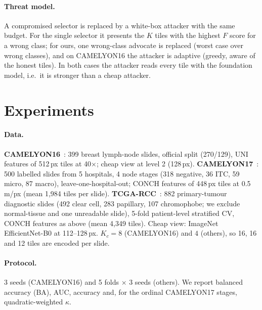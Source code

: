 \documentclass[runningheads]{llncs}
\begin{document}
\paragraph{Threat model.} A compromised selector is replaced by a white-box attacker with the same budget. For the single selector it presents the $K$ tiles with the highest $F$ score for a wrong class; for ours, one wrong-class advocate is replaced (worst case over wrong classes), and on CAMELYON16 the attacker is adaptive (greedy, aware of the honest tiles). In both cases the attacker reads every tile with the foundation model, i.e.\ it is stronger than a cheap attacker.

\section{Experiments}
\paragraph{Data.} \textbf{CAMELYON16}~\cite{c16}: 399 breast lymph-node slides, official split (270/129), UNI features of 512\,px tiles at 40$\times$; cheap view at level 2 (128\,px). \textbf{CAMELYON17}~\cite{camelyon17}: 500 labelled slides from 5 hospitals, 4 node stages (318 negative, 36 ITC, 59 micro, 87 macro), leave-one-hospital-out; CONCH features of 448\,px tiles at 0.5\,\textmu m/px (mean 1{,}984 tiles per slide). \textbf{TCGA-RCC}~\cite{tcga}: 882 primary-tumour diagnostic slides (492 clear cell, 283 papillary, 107 chromophobe; we exclude normal-tissue and one unreadable slide), 5-fold patient-level stratified CV, CONCH features as above (mean 4{,}349 tiles). Cheap view: ImageNet EfficientNet-B0 at 112--128\,px. $K_c{=}8$ (CAMELYON16) and $4$ (others), so 16, 16 and 12 tiles are encoded per slide.
\paragraph{Protocol.} 3 seeds (CAMELYON16) and 5 folds $\times$ 3 seeds (others). We report balanced accuracy (BA), AUC, accuracy and, for the ordinal CAMELYON17 stages, quadratic-weighted $\kappa$.
\end{document}

